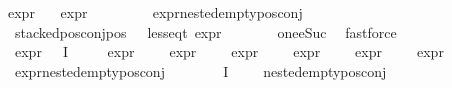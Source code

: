 \begin{isabellebody}
{\isachardoublequoteopen}expr{\isacharunderscore}{\kern0pt}{}\ {\isasymphi}\ {\isasymle}\ {}{\isachardoublequoteclose}\isanewline
{\isachardoublequoteopen}expr{\isacharunderscore}{\kern0pt}{}\ {\isasymphi}\ {\isasymle}\ {}{\isachardoublequoteclose}\isanewline
\ \ \ \ \isamarkupfalse%
\ expr{\isacharunderscore}{\kern0pt}nested{\isacharunderscore}{\kern0pt}empty{\isacharunderscore}{\kern0pt}pos{\isacharunderscore}{\kern0pt}conj\isanewline
\ \ \ \ \isamarkupfalse%
\ {\isacartoucheopen}stacked{\isacharunderscore}{\kern0pt}pos{\isacharunderscore}{\kern0pt}conj{\isacharunderscore}{\kern0pt}pos\ {\isasymphi}\ {\isasymand}\ less{\isacharunderscore}{\kern0pt}eq{\isacharunderscore}{\kern0pt}t\ {\isacharparenleft}{\kern0pt}expr\ {\isasymphi}{\isacharparenright}{\kern0pt}\ {\isacharparenleft}{\kern0pt}{}{\isacharcomma}{\kern0pt}\ {\isasyminfinity}{\isacharcomma}{\kern0pt}\ {}{\isacharcomma}{\kern0pt}\ {}{\isacharcomma}{\kern0pt}\ {}{\isacharcomma}{\kern0pt}\ {}{\isacharparenright}{\kern0pt}{\isacartoucheclose}\ one{\isacharunderscore}{\kern0pt}eSuc\ \isamarkupfalse%
\ fastforce{\isacharplus}{\kern0pt}\isanewline
\ \ \isamarkupfalse%
\ expr{\isacharunderscore}{\kern0pt}{\isasympsi}{\isacharcolon}{\kern0pt}\ {\isachardoublequoteopen}{\isacharparenleft}{\kern0pt}{\isasymforall}{\isasympsi}{\isasymin}{\isasymPhi}\ {\isacharbackquote}{\kern0pt}\ I{\isachardot}{\kern0pt}\ {\isasympsi}\ {\isasymnoteq}\ {\isasymphi}\ {\isasymlongrightarrow}\ \isanewline
expr{\isacharunderscore}{\kern0pt}{}\ {\isasympsi}\ {\isasymle}\ {}\ {\isasymand}\ expr{\isacharunderscore}{\kern0pt}{}\ {\isasympsi}\ {\isasymle}\ {\isasyminfinity}\ {\isasymand}\ expr{\isacharunderscore}{\kern0pt}{}\ {\isasympsi}\ {\isasymle}\ {}\ {\isasymand}\ expr{\isacharunderscore}{\kern0pt}{}\ {\isasympsi}\ {\isasymle}\ {}\ {\isasymand}\ expr{\isacharunderscore}{\kern0pt}{}\ {\isasympsi}\ {\isasymle}\ {}\ {\isasymand}\ expr{\isacharunderscore}{\kern0pt}{}\ {\isasympsi}\ {\isasymle}\ {}{\isacharparenright}{\kern0pt}{\isachardoublequoteclose}\isanewline
\ \ \ \ \isamarkupfalse%
\ expr{\isacharunderscore}{\kern0pt}nested{\isacharunderscore}{\kern0pt}empty{\isacharunderscore}{\kern0pt}pos{\isacharunderscore}{\kern0pt}conj\isanewline
\ \ \ \ \isamarkupfalse%
\ {\isacartoucheopen}{\isasymforall}{\isasympsi}{\isasymin}{\isasymPhi}\ {\isacharbackquote}{\kern0pt}\ I{\isachardot}{\kern0pt}\ {\isasympsi}\ {\isasymnoteq}\ {\isasymphi}\ {\isasymlongrightarrow}\ nested{\isacharunderscore}{\kern0pt}empty{\isacharunderscore}{\kern0pt}pos{\isacharunderscore}{\kern0pt}conj\ {\isasympsi}{\isacartoucheclose}\ \isamarkupfalse%

\end{isabellebody}
